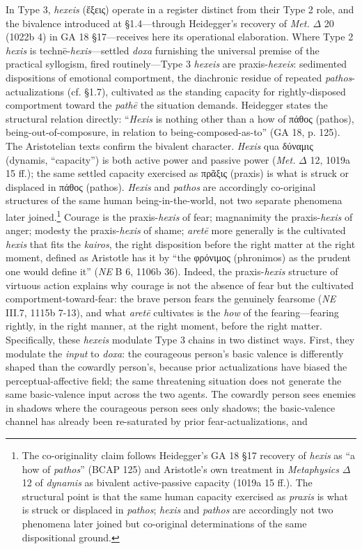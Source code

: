 \documentclass{article}
\newcommand{\gk}[1]{{\greekfont #1}}
\begin{document}
In Type 3, \textit{hexeis} (\gk{ἕξεις}) operate in a register distinct from their Type 2 role, and the bivalence introduced at \S 1.4---through Heidegger's recovery of \textit{Met.} $\Delta$ 20 (1022b 4) in GA 18 \S 17---receives here its operational elaboration. Where Type 2 \textit{hexis} is technē-\textit{hexis}---settled \textit{doxa} furnishing the universal premise of the practical syllogism, fired routinely---Type 3 \textit{hexeis} are praxis-\textit{hexeis}: sedimented dispositions of emotional comportment, the diachronic residue of repeated \textit{pathos}-actualizations (cf. \S 1.7), cultivated as the standing capacity for rightly-disposed comportment toward the \textit{pathē} the situation demands. Heidegger states the structural relation directly: ``\textit{Hexis} is nothing other than a how of \gk{πάθος} (pathos), being-out-of-composure, in relation to being-composed-as-to'' (GA 18, p. 125). The Aristotelian texts confirm the bivalent character. \textit{Hexis} qua \gk{δύναμις} (dynamis, ``capacity'') is both active power and passive power (\textit{Met.} $\Delta$ 12, 1019a 15 ff.); the same settled capacity exercised as \gk{πρᾶξις} (praxis) is what is struck or displaced in \gk{πάθος} (pathos). \textit{Hexis} and \textit{pathos} are accordingly co-original structures of the same human being-in-the-world, not two separate phenomena later joined.\footnote{The co-originality claim follows Heidegger's GA 18 \S 17 recovery of \textit{hexis} as ``a how of \textit{pathos}'' (BCAP 125) and Aristotle's own treatment in \textit{Metaphysics} $\Delta$ 12 of \textit{dynamis} as bivalent active-passive capacity (1019a 15 ff.). The structural point is that the same human capacity exercised as \textit{praxis} is what is struck or displaced in \textit{pathos}; \textit{hexis} and \textit{pathos} are accordingly not two phenomena later joined but co-original determinations of the same dispositional ground.} Courage is the praxis-\textit{hexis} of fear; magnanimity the praxis-\textit{hexis} of anger; modesty the praxis-\textit{hexis} of shame; \textit{aretē} more generally is the cultivated \textit{hexis} that fits the \textit{kairos}, the right disposition before the right matter at the right moment, defined as Aristotle has it by ``the \gk{φρόνιμος} (phronimos) as the prudent one would define it'' (\textit{NE} B 6, 1106b 36). Indeed, the praxis-\textit{hexis} structure of virtuous action explains why courage is not the absence of fear but the cultivated comportment-toward-fear: the brave person fears the genuinely fearsome (\textit{NE} III.7, 1115b 7-13), and what \textit{aretē} cultivates is the \textit{how} of the fearing---fearing rightly, in the right manner, at the right moment, before the right matter. Specifically, these \textit{hexeis} modulate Type 3 chains in two distinct ways. First, they modulate the \textit{input} to \textit{doxa}: the courageous person's basic valence is differently shaped than the cowardly person's, because prior actualizations have biased the perceptual-affective field; the same threatening situation does not generate the same basic-valence input across the two agents. The cowardly person sees enemies in shadows where the courageous person sees only shadows; the basic-valence channel has already been re-saturated by prior fear-actualizations, and 
\end{document}
